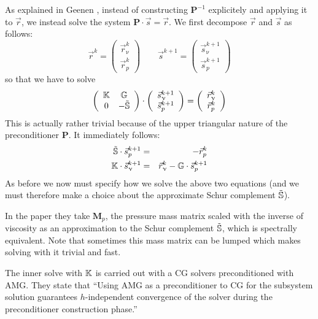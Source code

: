 As explained in Geenen \etal, instead of constructing ${\bm P}^{-1}$
explicitely and applying it to $\vec{r}$, we instead solve the system 
${\bm P}\cdot \vec{s} = \vec{r}$. We first decompose $\vec{r}$ and $\vec{s}$
as follows:
\[
\vec{r}^k = \left( \begin{array}{c} \vec{r}_\upnu^k \\ \vec{r}_p^k   \end{array} \right)
\qquad
\vec{s}^{k+1} = \left( \begin{array}{c} \vec{s}_\upnu^{k+1} \\ \vec{s}_p^{k+1}   \end{array} \right)
\]
so that we have to solve 
\[
\left(
\begin{array}{cc}
{\mathbb{K}} & {\mathbb{G}} \\
0 & - \tilde{{\mathbb{S}}}
\end{array}
\right)
\cdot
\left( \begin{array}{c} \vec{s}_\upnu^{k+1} \\ \vec{s}_p^{k+1}   \end{array} \right)
=
\left( \begin{array}{c} \vec{r}_\upnu^k \\ \vec{r}_p^k   \end{array} \right)
\]
This is actually rather trivial because of the upper triangular nature of the preconditioner ${\bm P}$.
It immediately follows:
\begin{eqnarray}
\tilde{{\mathbb{S}}}\cdot  \vec{s}_p^{k+1} &=& -\vec{r}_p^k   \\
{\mathbb{K}} \cdot \vec{s}_\upnu^{k+1} &=& \vec{r}_\upnu^k - {\mathbb{G}} \cdot \vec{s}_p^{k+1}
\end{eqnarray}
As before we now must specify how we solve the above two equations (and we must therefore
make a choice about the approximate Schur complement $\tilde{{\mathbb{S}}}$).

In the paper they take ${\bm  M}_p$, the pressure mass matrix scaled with the inverse of viscosity 
as an approximation to the Schur complement $\tilde{{\mathbb{S}}}$, which is spectrally equivalent.
Note that sometimes this mass matrix can be lumped which makes solving with it trivial and fast.

The inner solve with ${\mathbb{K}}$ is carried out with a CG solvers preconditioned with AMG. They 
state that ``Using AMG as a preconditioner to CG for the subsystem solution
guarantees $h$-independent convergence of the solver during the preconditioner construction phase.''


